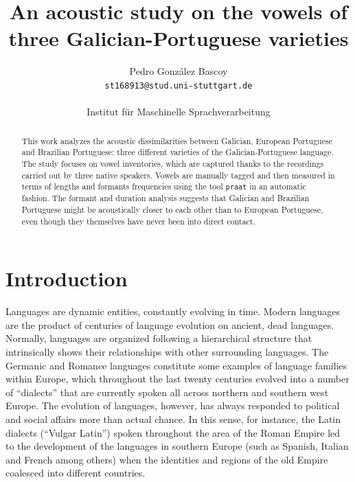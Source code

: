 \documentclass[a4paper,11pt]{article}
\begin{document}
	
	\title{An acoustic study on the vowels of three Galician-Portuguese varieties}
	\author{Pedro González Bascoy\\
		\texttt{st168913@stud.uni-stuttgart.de}\\
		\\Institut für Maschinelle Sprachverarbeitung}
	
	\maketitle
	
    
  \begin{abstract}
      This work analyzes the acoustic dissimilarities between Galician, European Portuguese and Brazilian Portuguese: three different varieties of the Galician-Portuguese language. The study focuses on vowel inventories, which are captured thanks to the recordings carried out by  three native speakers. Vowels are manually tagged and then measured in terms of lengths and formants frequencies using the tool \texttt{praat} in an automatic fashion. The formant and duration analysis suggests that Galician and Brazilian Portuguese might be acoustically closer to each other than to European Portuguese, even though they themselves have never been into direct contact.
  \end{abstract}
    
    \section{Introduction}
    
    Languages are dynamic entities, constantly evolving in time. Modern languages are the product of centuries of language evolution on ancient, dead languages. Normally, languages are organized following a hierarchical structure that intrinsically shows their relationships with other surrounding languages. The Germanic and Romance languages constitute some examples of language families within Europe, which throughout the last twenty centuries evolved into a number of ``dialects'' that are currently spoken all across northern and southern west Europe. The evolution of languages, however, has always responded to political and social affairs more than actual chance. In this sense, for instance, the Latin dialects (``Vulgar Latin'') spoken throughout the area of the Roman Empire led to the development of the languages in southern Europe (such as Spanish, Italian and French among others) when the identities and regions of the old Empire coalesced into different countries.\\
    
\end{document}
